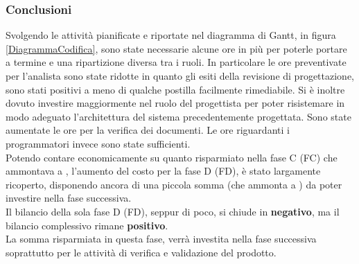 	\subsubsection{Conclusioni}
	\label{CCD}
Svolgendo le attività pianificate e riportate nel diagramma di Gantt\glossario{}, in figura \ref{DiagrammaCodifica}, sono state necessarie alcune ore in più per poterle portare a termine e una ripartizione diversa tra i ruoli. In particolare le ore preventivate per l'analista sono state ridotte in quanto gli esiti della revisione di progettazione, sono stati positivi a meno di qualche postilla facilmente rimediabile. Si è inoltre dovuto investire maggiormente nel ruolo del progettista per poter risistemare in modo adeguato l'architettura del sistema precedentemente progettata. Sono state aumentate le ore per la verifica dei documenti. Le ore riguardanti i programmatori invece sono state sufficienti.\\
Potendo contare economicamente su quanto risparmiato nella fase C (FC) che ammontava a , l'aumento del costo per la fase  D (FD), è stato largamente ricoperto, disponendo ancora di una piccola somma (che ammonta a ) da poter investire nella fase successiva. \\
Il bilancio della sola fase D (FD), seppur di poco, si chiude in \textbf{negativo}, ma il bilancio complessivo rimane \textbf{positivo}.\\
La somma risparmiata in questa fase, verrà investita nella fase successiva soprattutto per le attività di verifica e validazione del prodotto.
\pagebreak
